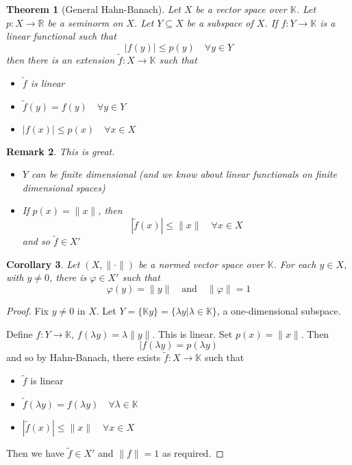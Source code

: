 \documentclass[12pt, oneside, a4paper]{article}
\newtheorem{thm}{Theorem}[section]
\newtheorem{cor}[thm]{Corollary}
\theoremstyle{dfn}
\newtheorem{rem}[thm]{Remark}
\renewcommand{\phi}{\varphi}
\newcommand{\R}{\mathbb{R}}
\newcommand{\K}{\mathbb{K}}
\begin{document}
\begin{thm}[General Hahn-Banach]
    Let $X$ be a vector space over $\K$.  Let $p: X \rightarrow \R$ be a seminorm on $X$.  Let $Y \subseteq X$ be a subspace of $X$.  If $f : Y \rightarrow \K$ is a linear functional such that \[
        | f(y) | \leq p(y) \quad \forall y \in Y
    \] then there is an extension $\tilde{f} : X \rightarrow \K$ such that 
    \begin{itemize}
        \item $\tilde{f}$ is linear
        \item $\tilde f (y) = f(y) \quad \forall y \in Y$
        \item $|f(x)| \leq p(x) \quad \forall x \in X$
    \end{itemize}
\end{thm}

\begin{rem}
    This is great.
    \begin{itemize}
        \item $Y$ can be finite dimensional (and we know about linear functionals on finite dimensional spaces)
        \item If $p(x) = \| x \|$, then \[
            |\tilde f (x) | \leq \|x \| \quad \forall x \in X
        \] and so $\tilde f \in X'$
    \end{itemize}
\end{rem}

\begin{cor}
    Let $(X, \| \cdot \|)$ be a normed vector space over $\K$.  For each $y \in X$, with $y \neq 0$, there is $\phi \in X'$ such that \[
        \phi(y) = \| y \| \quad \text{and} \quad \| \phi \| = 1
    \]
\end{cor}
\begin{proof}
    Fix $y \neq 0$ in $X$.  Let $Y = \{ \K y \} = \{ \lambda y | \lambda \in \K \}$, a one-dimensional subspace.  
    
    Define $f : Y \rightarrow \K$, $f( \lambda y) = \lambda \| y \|$.  This is linear.  Set $p(x) = \| x \|$.  Then \[
        | f(\lambda y ) = p(\lambda y)
    \] and so by Hahn-Banach, there exists $\tilde f : X \rightarrow \K$ such that
    \begin{itemize}
        \item $\tilde f$ is linear
        \item $\tilde f(\lambda y) = f( \lambda y) \quad \forall \lambda \in \K$
        \item $| \tilde f (x) | \leq \| x \| \quad \forall x \in X$
    \end{itemize}
    Then we  have $\tilde f \in X'$ and $\| f \| = 1$ as required.
\end{proof}
\end{document}
